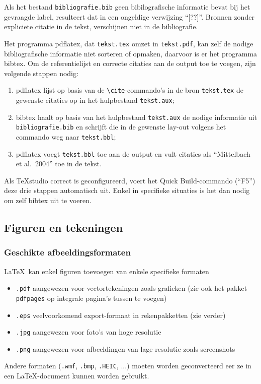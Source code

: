 \documentclass[kulak]{kulakarticle} %
\begin{document}
Als het bestand \texttt{bibliografie.bib} geen bibilografische informatie bevat bij het gevraagde label, resulteert dat in een ongeldige verwijzing ``[??]''. Bronnen zonder expliciete citatie in de tekst, verschijnen niet in de bibliografie.

Het programma pdflatex, dat \texttt{tekst.tex} omzet in \texttt{tekst.pdf}, kan zelf de nodige bibliografische informatie niet sorteren of opmaken, daarvoor is er het programma bibtex. Om de referentielijst en correcte citaties aan de output toe te voegen, zijn volgende stappen nodig:

\begin{enumerate}
	\item pdflatex lijst op basis van de \verb+\cite+-commando's in de bron \texttt{tekst.tex} de gewenste citaties op in het hulpbestand \texttt{tekst.aux};
	\item bibtex haalt op basis van het hulpbestand \texttt{tekst.aux} de nodige informatie uit \texttt{bibliografie.bib} en schrijft die in de gewenste lay-out volgens het commando \verb++ weg naar \texttt{tekst.bbl};
	\item pdflatex voegt \texttt{tekst.bbl} toe aan de output en vult citaties als ``Mittelbach et al.\ 2004'' toe in de tekst.
\end{enumerate}
Als TeXstudio correct is geconfigureerd, voert het Quick Build-commando (``F5'') deze drie stappen automatisch uit. Enkel in specifieke situaties is het dan nodig om zelf bibtex uit te voeren.

\subsection{Figuren en tekeningen}

\subsubsection{Geschikte afbeeldingsformaten}
\LaTeX\ kan enkel figuren toevoegen van enkele specifieke formaten
\begin{itemize}
	\item \texttt{.pdf} aangewezen voor vectortekeningen zoals grafieken (zie ook het pakket \texttt{pdfpages} op integrale pagina's tussen te voegen)
	\item \texttt{.eps} veelvoorkomend export-formaat in rekenpakketten (zie verder)
	\item \texttt{.jpg} aangewezen voor foto's van hoge resolutie
	\item \texttt{.png} aangewezen voor afbeeldingen van lage resolutie zoals screenshots
\end{itemize}
Andere formaten (\texttt{.wmf}, \texttt{.bmp}, \texttt{.HEIC}, ...) moeten worden geconverteerd eer ze in een \LaTeX-document kunnen worden gebruikt.
\end{document}
